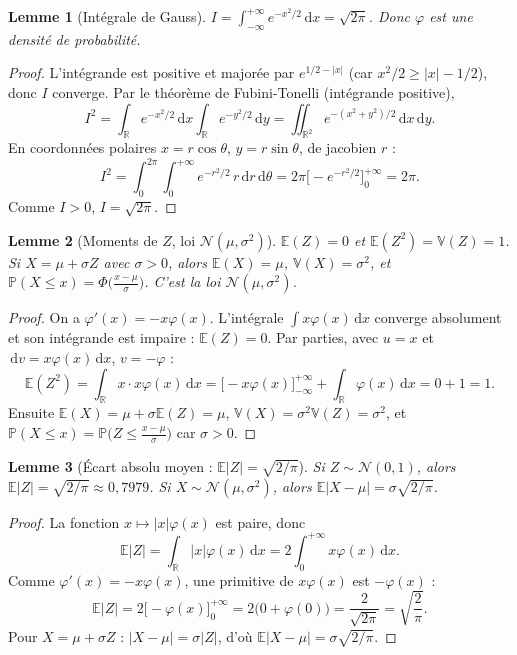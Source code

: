 \documentclass[11pt,a4paper]{article}
\theoremstyle{tq}
\newtheorem{lem}{Lemme}
\theoremstyle{remark}
\newcommand{\E}{\mathbb{E}}
\newcommand{\V}{\mathbb{V}}
\renewcommand{\P}{\mathbb{P}}
\newcommand{\R}{\mathbb{R}}
\newcommand{\N}{\mathcal{N}}
\newcommand{\dd}{\,\mathrm{d}}
\begin{document}
\begin{lem}[Intégrale de Gauss]\label{lem:gauss}
$\displaystyle I=\int_{-\infty}^{+\infty} e^{-x^2/2}\dd x=\sqrt{2\pi}$. Donc $\varphi$ est une densité de probabilité.
\end{lem}
\begin{proof}
L'intégrande est positive et majorée par $e^{1/2-|x|}$ (car $x^2/2 \ge |x|-1/2$), donc $I$ converge. Par le théorème de Fubini-Tonelli (intégrande positive),
\[
I^2=\int_{\R}e^{-x^2/2}\dd x\int_{\R}e^{-y^2/2}\dd y=\iint_{\R^2}e^{-(x^2+y^2)/2}\dd x\dd y .
\]
En coordonnées polaires $x=r\cos\theta$, $y=r\sin\theta$, de jacobien $r$ :
\[
I^2=\int_0^{2\pi}\!\!\int_0^{+\infty}e^{-r^2/2}\,r\dd r\dd\theta=2\pi\Big[-e^{-r^2/2}\Big]_0^{+\infty}=2\pi .
\]
Comme $I>0$, $I=\sqrt{2\pi}$.
\end{proof}

\begin{lem}[Moments de $Z$, loi $\N(\mu,\sigma^2)$]\label{lem:moments}
$\E(Z)=0$ et $\E(Z^2)=\V(Z)=1$. Si $X=\mu+\sigma Z$ avec $\sigma>0$, alors $\E(X)=\mu$, $\V(X)=\sigma^2$, et $\P(X\le x)=\Phi\!\big(\tfrac{x-\mu}{\sigma}\big)$. C'est la loi $\N(\mu,\sigma^2)$.
\end{lem}
\begin{proof}
On a $\varphi'(x)=-x\varphi(x)$. L'intégrale $\int x\varphi(x)\dd x$ converge absolument et son intégrande est impaire : $\E(Z)=0$. Par parties, avec $u=x$ et $\dd v=x\varphi(x)\dd x$, $v=-\varphi$ :
\[
\E(Z^2)=\int_{\R}x\cdot x\varphi(x)\dd x=\Big[-x\varphi(x)\Big]_{-\infty}^{+\infty}+\int_{\R}\varphi(x)\dd x=0+1=1 .
\]
Ensuite $\E(X)=\mu+\sigma\E(Z)=\mu$, $\V(X)=\sigma^2\V(Z)=\sigma^2$, et $\P(X\le x)=\P\big(Z\le \frac{x-\mu}{\sigma}\big)$ car $\sigma>0$.
\end{proof}

\begin{lem}[Écart absolu moyen : $\E|Z|=\sqrt{2/\pi}$]\label{lem:EZ}
Si $Z\sim\N(0,1)$, alors $\E|Z|=\sqrt{2/\pi}\approx 0{,}7979$. Si $X\sim\N(\mu,\sigma^2)$, alors $\E|X-\mu|=\sigma\sqrt{2/\pi}$.
\end{lem}
\begin{proof}
La fonction $x\mapsto|x|\varphi(x)$ est paire, donc
\[
\E|Z|=\int_{\R}|x|\varphi(x)\dd x=2\int_0^{+\infty}x\varphi(x)\dd x .
\]
Comme $\varphi'(x)=-x\varphi(x)$, une primitive de $x\varphi(x)$ est $-\varphi(x)$ :
\[
\E|Z|=2\Big[-\varphi(x)\Big]_0^{+\infty}=2\big(0+\varphi(0)\big)=\frac{2}{\sqrt{2\pi}}=\sqrt{\frac{2}{\pi}} .
\]
Pour $X=\mu+\sigma Z$ : $|X-\mu|=\sigma|Z|$, d'où $\E|X-\mu|=\sigma\sqrt{2/\pi}$.
\end{proof}
\end{document}
